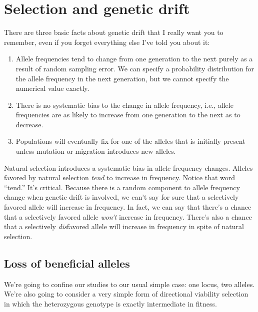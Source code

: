 \chapter{Selection and genetic drift}

There are three basic facts about genetic drift that I really want you
to remember, even if you forget everything else I've told you about
it:

\begin{enumerate}

\item Allele frequencies tend to change from one generation to the
next purely as a result of random sampling error. We can specify a
probability distribution for the allele frequency in the next
generation, but we cannot specify the numerical value exactly.

\item There is no systematic bias to the change in allele frequency,
i.e., allele frequencies are as likely to increase from one generation
to the next as to decrease.

\item Populations will eventually fix for one of the alleles that is
initially present unless mutation or migration introduces new
alleles. 

\end{enumerate}

Natural selection introduces a systematic bias in allele frequency
changes. Alleles favored by natural selection {\it tend\/} to increase
in frequency. Notice that word ``tend.'' It's critical. Because there
is a random component to allele frequency change when genetic drift is
involved, we can't say for sure that a selectively favored allele will
increase in frequency. In fact, we can say that there's a chance that
a selectively favored allele {\it won't\/} increase in
frequency. There's also a chance that a selectively {\it dis\/}favored
allele will increase in frequency in spite of natural selection.

\section*{Loss of beneficial alleles}

We're going to confine our studies to our usual simple case: one
locus, two alleles. We're also going to consider a very simple form of
directional viability selection in which the heterozygous genotype is
exactly intermediate in fitness.

